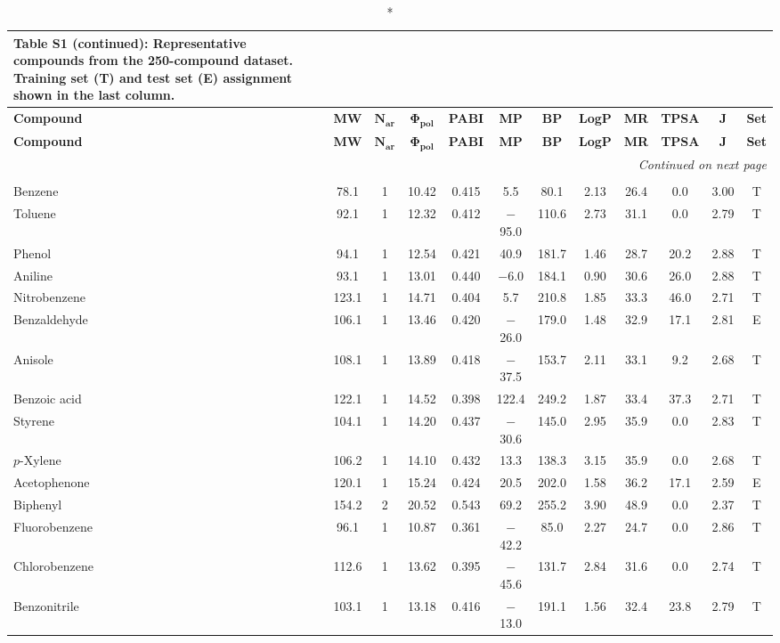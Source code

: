 \documentclass[12pt,a4paper]{article}
\begin{document}
\begin{small}
\begin{longtable}{@{}p{2.8cm}ccccccccccc@{}}
\caption*{\textbf{Table S1} (continued): Representative compounds from the 250-compound dataset. Training set (T) and test set (E) assignment shown in the last column.}\\
\toprule
\textbf{Compound} & \textbf{MW} & $\mathbf{N_{\text{ar}}}$ & $\mathbf{\Phi_{\text{pol}}}$ & \textbf{PABI} & \textbf{MP} & \textbf{BP} & \textbf{LogP} & \textbf{MR} & \textbf{TPSA} & $\mathbf{J}$ & \textbf{Set} \\
\midrule
\endfirsthead

\toprule
\textbf{Compound} & \textbf{MW} & $\mathbf{N_{\text{ar}}}$ & $\mathbf{\Phi_{\text{pol}}}$ & \textbf{PABI} & \textbf{MP} & \textbf{BP} & \textbf{LogP} & \textbf{MR} & \textbf{TPSA} & $\mathbf{J}$ & \textbf{Set} \\
\midrule
\endhead

\midrule
\multicolumn{12}{r}{\textit{Continued on next page}} \\
\endfoot

\bottomrule
\endlastfoot

\multicolumn{12}{l}{\textit{\textbf{Simple Aromatics}}} \\
\midrule
Benzene & 78.1 & 1 & 10.42 & 0.415 & 5.5 & 80.1 & 2.13 & 26.4 & 0.0 & 3.00 & T \\
Toluene & 92.1 & 1 & 12.32 & 0.412 & $-$95.0 & 110.6 & 2.73 & 31.1 & 0.0 & 2.79 & T \\
Phenol & 94.1 & 1 & 12.54 & 0.421 & 40.9 & 181.7 & 1.46 & 28.7 & 20.2 & 2.88 & T \\
Aniline & 93.1 & 1 & 13.01 & 0.440 & $-$6.0 & 184.1 & 0.90 & 30.6 & 26.0 & 2.88 & T \\
Nitrobenzene & 123.1 & 1 & 14.71 & 0.404 & 5.7 & 210.8 & 1.85 & 33.3 & 46.0 & 2.71 & T \\
Benzaldehyde & 106.1 & 1 & 13.46 & 0.420 & $-$26.0 & 179.0 & 1.48 & 32.9 & 17.1 & 2.81 & E \\
Anisole & 108.1 & 1 & 13.89 & 0.418 & $-$37.5 & 153.7 & 2.11 & 33.1 & 9.2 & 2.68 & T \\
Benzoic acid & 122.1 & 1 & 14.52 & 0.398 & 122.4 & 249.2 & 1.87 & 33.4 & 37.3 & 2.71 & T \\
Styrene & 104.1 & 1 & 14.20 & 0.437 & $-$30.6 & 145.0 & 2.95 & 35.9 & 0.0 & 2.83 & T \\
$p$-Xylene & 106.2 & 1 & 14.10 & 0.432 & 13.3 & 138.3 & 3.15 & 35.9 & 0.0 & 2.68 & T \\
Acetophenone & 120.1 & 1 & 15.24 & 0.424 & 20.5 & 202.0 & 1.58 & 36.2 & 17.1 & 2.59 & E \\
Biphenyl & 154.2 & 2 & 20.52 & 0.543 & 69.2 & 255.2 & 3.90 & 48.9 & 0.0 & 2.37 & T \\
Fluorobenzene & 96.1 & 1 & 10.87 & 0.361 & $-$42.2 & 85.0 & 2.27 & 24.7 & 0.0 & 2.86 & T \\
Chlorobenzene & 112.6 & 1 & 13.62 & 0.395 & $-$45.6 & 131.7 & 2.84 & 31.6 & 0.0 & 2.74 & T \\
Benzonitrile & 103.1 & 1 & 13.18 & 0.416 & $-$13.0 & 191.1 & 1.56 & 32.4 & 23.8 & 2.79 & T \\


\end{longtable}
\end{small}
\end{document}
